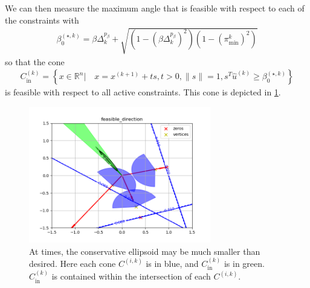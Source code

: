 \documentclass{article}
\theoremstyle{case}
\numberwithin{theorem}{subsection}
\newcommand{\bsk}{{\beta_0^{(\star, k)}}}
\newcommand{\dk}{\Delta_k}
\newcommand{\fcki}{{C^{(k)}_{\textrm{in}}}}
\newcommand{\huk}{{{\hat u}^{(k)}}}
\newcommand{\Rn}{\mathbb R^n}
\newcommand{\thetamink}{{\pi^k_{\textrm{min}}}}
\newcommand{\xkpo}{{{x}^{(k+1)}}}
\newcommand{\fik}{{C^{(i, k)}}}
\begin{document}
We can then measure the maximum angle that is feasible with respect to each of the constraints with
\begin{align}
\bsk = \beta\dk^{p_{\beta}} + \sqrt{\left(1 - \left(\beta\dk^{p_{\beta}}\right)^2\right)\left(1 - \left(\thetamink\right) ^2\right)} \label{define_bsk}
\end{align}
so that the cone
\begin{align}
\fcki = \left\{x \in \Rn \bigg| \quad x = \xkpo + ts, t > 0, \|s\| = 1, s^T\huk \ge \bsk \right\} \label{define_inner_cone}
\end{align}
is feasible with respect to all active constraints.
This cone is depicted in \cref{feasible_direction}.
\begin{figure}[ht]
    \centering
    \includegraphics[width=300px]{images/feasible_direction.png}
    \caption{
    	At times, the conservative ellipsoid may be much smaller than desired.
    	Here each cone $\fik$ is in blue, and $\fcki$ is in green.
    	$\fcki$ is contained within the intersection of each $\fik$.
	}
    \label{feasible_direction}
\end{figure}
\end{document}
